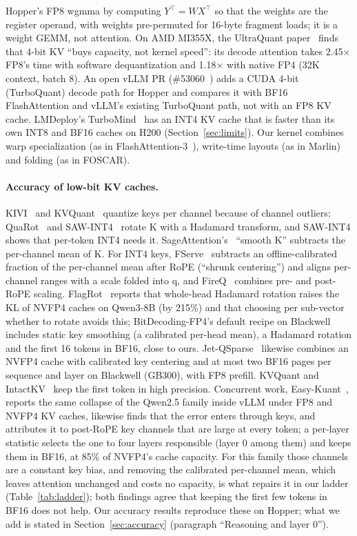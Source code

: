 \documentclass[11pt]{article}
\begin{document}
Hopper's FP8 wgmma by computing $Y^\top = W X^\top$ so that the weights are the register operand, with weights pre-permuted for 16-byte fragment loads; it is a weight GEMM, not attention. On AMD MI355X, the UltraQuant paper~\cite{chakrabarti2026ultraquant} finds that 4-bit KV ``buys capacity, not kernel speed'': its decode attention takes 2.45$\times$ FP8's time with software dequantization and 1.18$\times$ with native FP4 (32K context, batch 8). An open vLLM PR (\#53060~\cite{vllm53060}) adds a CUDA 4-bit (TurboQuant) decode path for Hopper and compares it with BF16 FlashAttention and vLLM's existing TurboQuant path, not with an FP8 KV cache. LMDeploy's TurboMind~\cite{lmdeploy} has an INT4 KV cache that is faster than its own INT8 and BF16 caches on H200 (Section~\ref{sec:limits}). Our kernel combines warp specialization (as in FlashAttention-3~\cite{shah2024flashattention3}), write-time layouts (as in Marlin) and folding (as in FOSCAR).

\paragraph{Accuracy of low-bit KV caches.} KIVI~\cite{liu2024kivi} and KVQuant~\cite{hooper2024kvquant} quantize keys per channel because of channel outliers; QuaRot~\cite{ashkboos2024quarot} and SAW-INT4~\cite{jia2026sawint4} rotate K with a Hadamard transform, and SAW-INT4 shows that per-token INT4 needs it. SageAttention's~\cite{zhang2025sageattention} ``smooth K'' subtracts the per-channel mean of K. For INT4 keys, FServe~\cite{baek2026fserve} subtracts an offline-calibrated fraction of the per-channel mean after RoPE (``shrunk centering'') and aligns per-channel ranges with a scale folded into q, and FireQ~\cite{baek2025fireq} combines pre- and post-RoPE scaling. FlagRot~\cite{shao2026flagrot} reports that whole-head Hadamard rotation raises the KL of NVFP4 caches on Qwen3-8B (by 215\%) and that choosing per sub-vector whether to rotate avoids this; BitDecoding-FP4's default recipe on Blackwell includes static key smoothing (a calibrated per-head mean), a Hadamard rotation and the first 16 tokens in BF16, close to ours. Jet-QSparse~\cite{tang2026jetqsparse} likewise combines an NVFP4 cache with calibrated key centering and at most two BF16 pages per sequence and layer on Blackwell (GB300), with FP8 prefill. KVQuant and IntactKV~\cite{liu2024intactkv} keep the first token in high precision. Concurrent work, Easy-Kuant~\cite{easykuant2026}, reports the same collapse of the Qwen2.5 family inside vLLM under FP8 and NVFP4 KV caches, likewise finds that the error enters through keys, and attributes it to post-RoPE key channels that are large at every token; a per-layer statistic selects the one to four layers responsible (layer 0 among them) and keeps them in BF16, at 85\% of NVFP4's cache capacity. For this family those channels are a constant key bias, and removing the calibrated per-channel mean, which leaves attention unchanged and costs no capacity, is what repairs it in our ladder (Table~\ref{tab:ladder}); both findings agree that keeping the first few tokens in BF16 does not help. Our accuracy results reproduce these on Hopper; what we add is stated in Section~\ref{sec:accuracy} (paragraph ``Reasoning and layer 0'').
\end{document}
